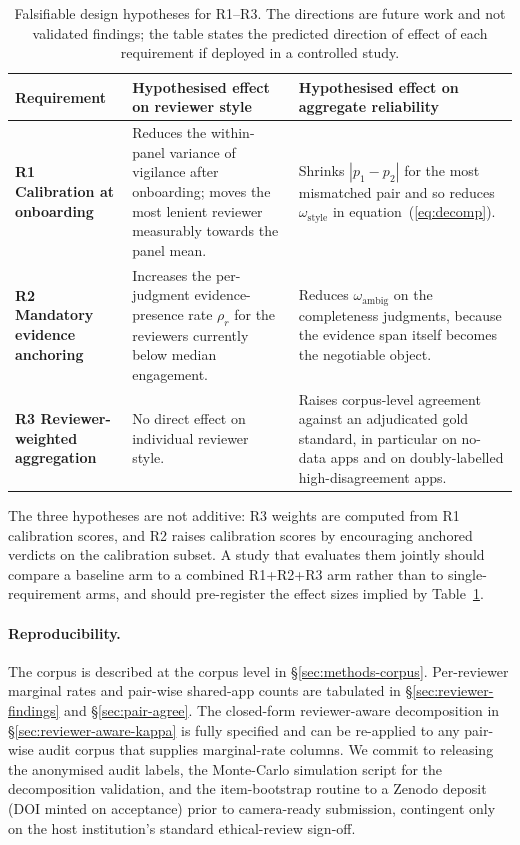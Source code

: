 \documentclass[11pt,a4paper]{article}
\begin{document}
\begin{table}[!htbp]
\centering\small
\caption{Falsifiable design hypotheses for R1--R3. The directions
are future work and not validated findings; the table states the
predicted direction of effect of each requirement if deployed in a
controlled study.}
\label{tab:r-effects}
\setlength{\tabcolsep}{8pt}
\renewcommand{\arraystretch}{1.25}
\begin{tabular}{@{}>{\bfseries}p{}
                    p{}
                    p{}@{}}
\toprule
\normalfont\textbf{Requirement}
   & \textbf{Hypothesised effect on reviewer style}
   & \textbf{Hypothesised effect on aggregate reliability} \\
\midrule
R1 Calibration at onboarding
   & Reduces the within-panel variance of vigilance after
     onboarding; moves the most lenient reviewer measurably
     towards the panel mean.
   & Shrinks $|p_1\!-\!p_2|$ for the most mismatched pair and so
     reduces $\omega_{\text{style}}$ in
     equation~(\ref{eq:decomp}). \\
\addlinespace[2pt]
R2 Mandatory evidence anchoring
   & Increases the per-judgment evidence-presence rate $\rho_r$ for
     the reviewers currently below median engagement.
   & Reduces $\omega_{\text{ambig}}$ on the completeness
     judgments, because the evidence span itself becomes the
     negotiable object. \\
\addlinespace[2pt]
R3 Reviewer-weighted aggregation
   & No direct effect on individual reviewer style.
   & Raises corpus-level agreement against an adjudicated gold
     standard, in particular on no-data apps and on
     doubly-labelled high-disagreement apps. \\
\bottomrule
\end{tabular}
\end{table}

The three hypotheses are not additive: R3 weights are computed from
R1 calibration scores, and R2 raises calibration scores by
encouraging anchored verdicts on the calibration subset. A study
that evaluates them jointly should compare a baseline arm to a
combined R1+R2+R3 arm rather than to single-requirement arms, and
should pre-register the effect sizes implied by Table~\ref{tab:r-effects}.

\paragraph{Reproducibility.}
The corpus is described at the corpus level in
\S\ref{sec:methods-corpus}. Per-reviewer marginal rates and pair-wise
shared-app counts are tabulated in \S\ref{sec:reviewer-findings} and
\S\ref{sec:pair-agree}. The closed-form reviewer-aware decomposition
in \S\ref{sec:reviewer-aware-kappa} is fully specified and can be
re-applied to any pair-wise audit corpus that supplies marginal-rate
columns. We commit to releasing the anonymised audit labels, the
Monte-Carlo simulation script for the decomposition validation, and
the item-bootstrap routine to a Zenodo deposit (DOI minted on
acceptance) prior to camera-ready submission, contingent only on the
host institution's standard ethical-review sign-off.
\end{document}
